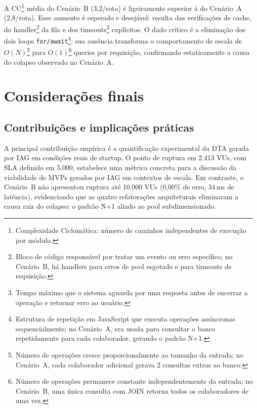 \documentclass[sigconf]{acmart}
\begin{document}
A CC\footnote{Complexidade Ciclomática: número de caminhos independentes de execução
por módulo.} média do Cenário~B (3,2/rota) é ligeiramente superior à do Cenário~A
(2,8/rota). Esse aumento é esperado e desejável: resulta das verificações de cache,
do handler\footnote{Bloco de código responsável por tratar um evento ou erro
específico; no Cenário~B, há handlers para erros de pool esgotado e para timeouts de
requisição.} da fila e dos timeouts\footnote{Tempo máximo que o sistema aguarda por
uma resposta antes de encerrar a operação e retornar erro ao usuário.} explícitos.
O dado crítico é a eliminação dos dois loops \texttt{for/await}\footnote{Estrutura
de repetição em JavaScript que executa operações assíncronas sequencialmente; no
Cenário~A, era usada para consultar o banco repetidamente para cada colaborador,
gerando o padrão N+1.}: sua ausência transforma o comportamento de escala de
$O(N)$\footnote{Número de operações cresce proporcionalmente ao tamanho da entrada;
no Cenário~A, cada colaborador adicional gerava 2 consultas extras ao banco.} para
$O(1)$\footnote{Número de operações permanece constante independentemente da entrada;
no Cenário~B, uma única consulta com JOIN retorna todos os colaboradores de uma vez.}
queries por requisição, confirmando estaticamente a causa do colapso observado no
Cenário~A.

\section{Considerações finais}

\subsection{Contribuições e implicações práticas}

A principal contribuição empírica é a quantificação experimental da DTA gerada
por IAG em condições reais de startup. O ponto de ruptura em 2.413 VUs, com SLA
definido em 5.000, estabelece uma métrica concreta para a discussão da viabilidade
de MVPs gerados por IAG em contextos de escala. Em contraste, o Cenário~B não
apresentou ruptura até 10.000 VUs (0,00\% de erro, 34\,ms de latência), evidenciando
que as quatro refatorações arquiteturais eliminaram a causa raiz do colapso: o
padrão N+1 aliado ao pool subdimensionado.
\end{document}

